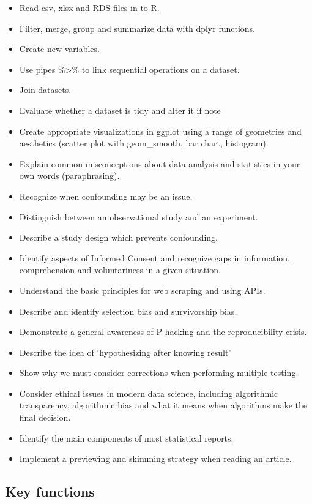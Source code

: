\documentclass[
  openany]{book}
\begin{document}
\begin{itemize}
\item
  Read csv, xlsx and RDS files in to R.
\item
  Filter, merge, group and summarize data with dplyr functions.
\item
  Create new variables.
\item
  Use pipes \%\textgreater\% to link sequential operations on a dataset.
\item
  Join datasets.
\item
  Evaluate whether a dataset is tidy and alter it if note
\item
  Create appropriate visualizations in ggplot using a range of geometries and aesthetics (scatter plot with geom\_smooth, bar chart, histogram).
\item
  Explain common misconceptions about data analysis and statistics in your own words (paraphrasing).
\item
  Recognize when confounding may be an issue.
\item
  Distinguish between an observational study and an experiment.
\item
  Describe a study design which prevents confounding.
\item
  Identify aspects of Informed Consent and recognize gaps in information, comprehension and voluntariness in a given situation.
\item
  Understand the basic principles for web scraping and using APIs.
\item
  Describe and identify selection bias and survivorship bias.
\item
  Demonstrate a general awareness of P-hacking and the reproducibility crisis.
\item
  Describe the idea of `hypothesizing after knowing result'
\item
  Show why we must consider corrections when performing multiple testing.~
\item
  Consider ethical issues in modern data science, including algorithmic transparency, algorithmic bias and what it means when algorithms make the final decision.
\item
  Identify the main components of most statistical reports.
\item
  Implement a previewing and skimming strategy when reading an article.
\end{itemize}

\hypertarget{key-functions}{%
\subsection{Key functions}\label{key-functions}}
\end{document}
